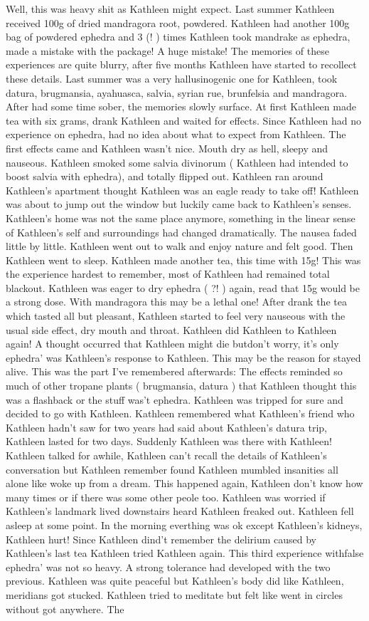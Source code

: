 \documentclass[12pt]{book}
\begin{document}
Well, this was heavy shit as Kathleen might expect. Last summer Kathleen received 100g of dried mandragora root, powdered. Kathleen had another 100g bag of powdered ephedra and 3 (! ) times Kathleen took mandrake as ephedra, made a mistake with the package! A huge mistake! The memories of these experiences are quite blurry, after five months Kathleen have started to recollect these details. Last summer was a very hallusinogenic one for Kathleen, took datura, brugmansia, ayahuasca, salvia, syrian rue, brunfelsia and mandragora. After had some time sober, the memories slowly surface. At first Kathleen made tea with six grams, drank Kathleen and waited for effects. Since Kathleen had no experience on ephedra, had no idea about what to expect from Kathleen. The first effects came and Kathleen wasn't nice. Mouth dry as hell, sleepy and nauseous. Kathleen smoked some salvia divinorum ( Kathleen had intended to boost salvia with ephedra), and totally flipped out. Kathleen ran around Kathleen's apartment thought Kathleen was an eagle ready to take off! Kathleen was about to jump out the window but luckily came back to Kathleen's senses. Kathleen's home was not the same place anymore, something in the linear sense of Kathleen's self and surroundings had changed dramatically. The nausea faded little by little. Kathleen went out to walk and enjoy nature and felt good. Then Kathleen went to sleep. Kathleen made another tea, this time with 15g! This was the experience hardest to remember, most of Kathleen had remained total blackout. Kathleen was eager to dry ephedra ( ?! ) again, read that 15g would be a strong dose. With mandragora this may be a lethal one! After drank the tea which tasted all but pleasant, Kathleen started to feel very nauseous with the usual side effect, dry mouth and throat. Kathleen did Kathleen to Kathleen again! A thought occurred that Kathleen might die butdon't worry, it's only ephedra' was Kathleen's response to Kathleen. This may be the reason for stayed alive. This was the part I've remembered afterwards: The effects reminded so much of other tropane  plants ( brugmansia, datura ) that Kathleen thought this was a flashback or the stuff was't ephedra. Kathleen was tripped for sure and decided to go with Kathleen. Kathleen remembered what Kathleen's friend who Kathleen hadn't saw for two years had said about Kathleen's datura trip, Kathleen lasted for two days. Suddenly Kathleen was there with Kathleen! Kathleen talked for awhile, Kathleen can't recall the details of Kathleen's conversation but Kathleen remember found Kathleen mumbled insanities all alone like woke up from a dream. This happened again, Kathleen don't know how many times or if there was some other peole too. Kathleen was worried if Kathleen's landmark lived downstairs heard Kathleen freaked out. Kathleen fell asleep at some point. In the morning everthing was ok except Kathleen's kidneys, Kathleen hurt! Since Kathleen dind't remember the delirium caused by Kathleen's last tea Kathleen tried Kathleen again. This third experience withfalse ephedra' was not so heavy. A strong tolerance had developed with the two previous. Kathleen was quite peaceful but Kathleen's body did like Kathleen, meridians got stucked. Kathleen tried to meditate but felt like went in circles without got anywhere. The 
\end{document}
